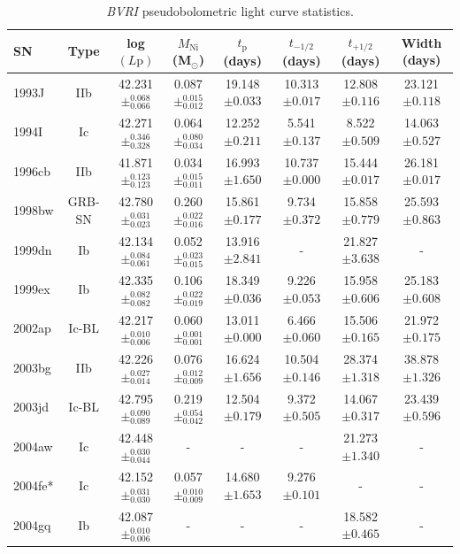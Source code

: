 \documentclass[a4paper,fleqn,usenatbib]{mnras}
\begin{document}
\begin{table}
\renewcommand{\arraystretch}{1.5}
 \centering
 \begin{minipage}{160mm}
  \caption{\textit{BVRI} pseudobolometric light curve statistics.}
 \begin{tabular}{lccccccc}
  \hline
 SN & Type & log$(L{\mathrm{p}})$ &$M_{\mathrm{Ni}}$ (M$_{\odot}$) &$t_{\mathrm{p}}$ (days) & $t_{-1/2}$ (days) & $t_{+1/2}$ (days) & Width (days)  \\
  \hline

1993J & IIb & 42.231$\pm^{0.068}_{0.066}$ & 0.087$\pm^{0.015}_{0.012}$ & 19.148$\pm{0.033}$ & 10.313$\pm 0.017$ & 12.808$\pm 0.116$ & 23.121$\pm 0.118$\\
1994I & Ic & 42.271$\pm^{0.346}_{0.328}$ & 0.064$\pm^{0.080}_{0.034}$ & 12.252$\pm{0.211}$ & 5.541$\pm 0.137$ & 8.522$\pm 0.509$ & 14.063$\pm 0.527$\\
1996cb & IIb & 41.871$\pm^{0.123}_{0.123}$ & 0.034$\pm^{0.015}_{0.011}$ & 16.993$\pm{1.650}$ & 10.737$\pm 0.000$ & 15.444$\pm 0.017$ & 26.181$\pm 0.017$\\
1998bw & GRB-SN & 42.780$\pm^{0.031}_{0.023}$ & 0.260$\pm^{0.022}_{0.016}$ & 15.861$\pm{0.177}$ & 9.734$\pm 0.372$ & 15.858$\pm 0.779$ & 25.593$\pm 0.863$\\
1999dn & Ib & 42.134$\pm^{0.084}_{0.061}$ & 0.052$\pm^{0.023}_{0.015}$ & 13.916$\pm{2.841}$ & - & 21.827$\pm 3.638$ & -\\
1999ex & Ib & 42.335$\pm^{0.082}_{0.082}$ & 0.106$\pm^{0.022}_{0.019}$ & 18.349$\pm{0.036}$ & 9.226$\pm 0.053$ & 15.958$\pm 0.606$ & 25.183$\pm 0.608$\\
2002ap & Ic-BL & 42.217$\pm^{0.010}_{0.006}$ & 0.060$\pm^{0.001}_{0.001}$ & 13.011$\pm{0.000}$ & 6.466$\pm 0.060$ & 15.506$\pm 0.165$ & 21.972$\pm 0.175$\\
2003bg & IIb & 42.226$\pm^{0.027}_{0.014}$ & 0.076$\pm^{0.012}_{0.009}$ & 16.624$\pm{1.656}$ & 10.504$\pm 0.146$ & 28.374$\pm 1.318$ & 38.878$\pm 1.326$\\
2003jd & Ic-BL & 42.795$\pm^{0.090}_{0.089}$ & 0.219$\pm^{0.054}_{0.042}$ & 12.504$\pm{0.179}$ & 9.372$\pm 0.505$ & 14.067$\pm 0.317$ & 23.439$\pm 0.596$\\
2004aw & Ic & 42.448$\pm^{0.030}_{0.044}$ & - & - & - & 21.273$\pm 1.340$ & -\\
2004fe* & Ic & 42.152$\pm^{0.031}_{0.030}$ & 0.057$\pm^{0.010}_{0.009}$ & 14.680$\pm{1.653}$ & 9.276$\pm 0.101$ & - & -\\
2004gq & Ib & 42.087$\pm^{0.010}_{0.006}$ & - & - & - & 18.582$\pm 0.465$ & -\\

\end{tabular}
\end{minipage}
\end{table}
\end{document}
